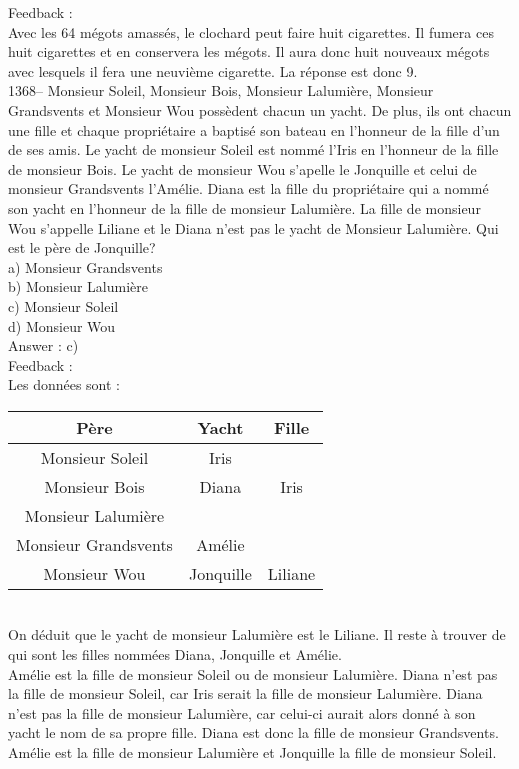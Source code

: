 \documentclass[letterpaper, 12pt]{article}
\begin{document}
Feedback : \\
Avec les 64 m\'egots amass\'es, le clochard peut faire huit cigarettes.  Il
fumera ces huit cigarettes et en conservera les m\'egots.  Il aura donc huit
nouveaux m\'egots avec lesquels il fera une neuvi\`eme cigarette.  La
r\'eponse est donc 9.\\

1368-- Monsieur Soleil, Monsieur Bois, Monsieur Lalumi\`ere, Monsieur
Grandsvents et Monsieur Wou poss\`edent chacun un yacht.  De plus, ils ont
chacun une fille et chaque propri\'etaire a baptis\'e son bateau en
l'honneur de la fille d'un de ses amis.  Le yacht de monsieur Soleil est
nomm\'e l'Iris en l'honneur de la fille de monsieur Bois.  Le yacht de
monsieur Wou s'apelle le Jonquille et celui de monsieur Grandsvents
l'Am\'elie.  Diana est la fille du propri\'etaire qui a nomm\'e son yacht en
l'honneur de la fille de monsieur Lalumi\`ere.  La fille de monsieur Wou
s'appelle Liliane et le Diana n'est pas le yacht de Monsieur Lalumi\`ere.
Qui est le p\`ere de Jonquille?\\
a) Monsieur Grandsvents\\
b) Monsieur Lalumi\`ere\\
c) Monsieur Soleil\\
d) Monsieur Wou\\

Answer : c)\\

Feedback : \\
Les donn\'ees sont : \\
\begin{tabular}{|c|c|c|} \hline
{\bf P\`ere} & {\bf Yacht} & {\bf Fille}  \\ \hline \hline

Monsieur Soleil        & Iris      &  \\ \hline Monsieur Bois &
Diana     &  Iris\\ \hline Monsieur Lalumi\`ere   &           &
\\ \hline Monsieur Grandsvents   & Am\'elie  &  \\ \hline Monsieur
Wou           & Jonquille &  Liliane\\ \hline

\end{tabular}\\

On d\'eduit que le yacht de monsieur Lalumi\`ere est le Liliane.  Il reste
\`a trouver de qui sont les filles nomm\'ees Diana, Jonquille et Am\'elie.
\\
Am\'elie est la fille de monsieur Soleil ou de monsieur Lalumi\`ere.  Diana
n'est pas la fille de monsieur Soleil, car Iris serait la fille de monsieur
Lalumi\`ere.  Diana n'est pas la fille de monsieur Lalumi\`ere, car celui-ci
aurait alors donn\'e \`a son yacht le nom de sa propre fille.  Diana est
donc la fille de monsieur Grandsvents.  Am\'elie est la fille de monsieur
Lalumi\`ere et Jonquille la fille de monsieur Soleil.  \\
\end{document}
